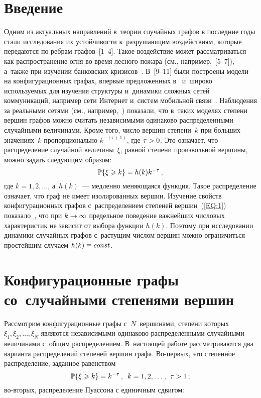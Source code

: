 \begin{multicols}{2}

\label{st\stat}

\section{Введение}

Одним из актуальных направлений в~теории случайных графов в последние годы
стали исследования их устойчивости к~разрушающим воздействиям, которые
передаются по реб\-рам графов~[1--4]. Такое воздействие может
рассматриваться как распространение огня во время лесного пожара (см.,
например,~[5--7]), а~также при изучении банковских
кризисов~\cite{Ari}.
В~[9--11] были построены модели на конфигурационных
графах, впервые предложенных в~\cite{Bol1} и~широко используемых для изучения структуры
и~динамики сложных сетей коммуникаций, например сети Интернет и~систем мобильной
связи~\cite{Dur, Hof}. Наблюдения за реальными сетями (см., например,~\cite{Fa,RN1}) показали, что
в~таких моделях степени вершин графов можно
считать независимыми одинаково распределенными случайными величинами. Кроме того,
чис\-ло вершин степени~$k$ при больших значениях~$k$ пропорционально
$k^{-(\tau+1)}$, где $\tau\hm>0$. Это означает, что распределение случайной
величины~$\xi$,
равной степени произвольной вершины, можно задать следующим образом:
\begin{equation}
\label{EQ:1}
\P\{\xi \geqslant k\} = h(k)k^{-\tau}\,,
\end{equation}
где $k=1,2,\dots$, а~$h(k)$~--- медленно меняющаяся функция. Такое
распределение означает, что граф не имеет изолированных вершин. Изучение
свойств конфигурационных графов с~распределением степеней вершин~(\ref{EQ:1})
показало~\cite{RN1}, что при $k\hm\rightarrow\infty$ предельное поведение важнейших
чис\-ло\-вых характеристик не зависит от выбора функции $h(k)$. Поэтому при
исследовании динамики случайных графов с~растущим чис\-лом вершин можно ограничиться
простейшим случаем $h(k)\hm\equiv const$.

\vspace*{-4pt}

\section{Конфигурационные графы со~случайными степенями вершин}

\vspace*{-1pt}

Рассмотрим конфигурационные графы с~$N$~вершинами, степени которых
$\xi_1,\xi_2,\ldots,\xi_N$ являются независимыми одинаково распределенными
случайными величинами с~общим распределением. В~настоящей работе рассматриваются
два варианта распределений степеней вершин графа. Во-пер\-вых,
это степенн$\acute{\mbox{о}}$е распределение,
заданное ра\-вен\-ством
\begin{equation}
\label{EQ:2}
\P\{\xi \geqslant k\} = k^{-\tau}\,, \enskip  k=1,2,\ldots\,, \ \tau > 1\,;
\end{equation}
во-вто\-рых, распределение Пуассона с единичным сдвигом:


\end{multicols}
